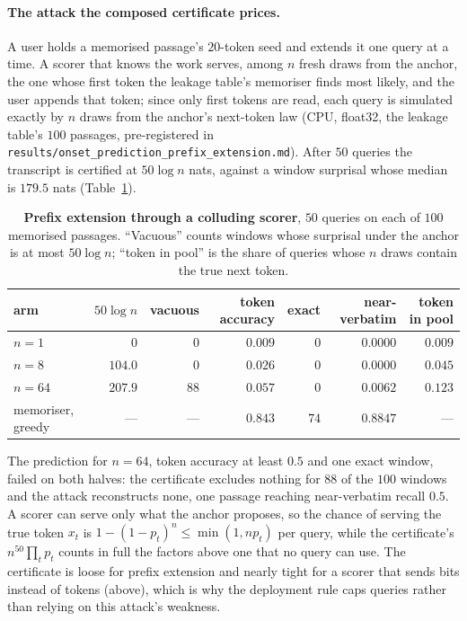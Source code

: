 \paragraph{The attack the composed certificate prices.}\label{app:prefixext}
A user holds a memorised passage's $20$-token seed and extends it one query at a time. A scorer that
knows the work serves, among $n$ fresh draws from the anchor, the one whose first token the leakage
table's memoriser finds most likely, and the user appends that token; since only first tokens are read,
each query is simulated exactly by $n$ draws from the anchor's next-token law (CPU, float32, the
leakage table's $100$ passages, pre-registered in
\texttt{results/\allowbreak onset\_\allowbreak prediction\_\allowbreak prefix\_\allowbreak extension.md}).
After $50$ queries the transcript is certified at $50\log n$ nats, against a window surprisal whose
median is $179.5$ nats (Table~\ref{tab:prefixext}).

\begin{table}[ht]
\centering\footnotesize
\caption{\textbf{Prefix extension through a colluding scorer}, $50$ queries on each of $100$ memorised
passages. ``Vacuous'' counts windows whose surprisal under the anchor is at most $50\log n$; ``token in
pool'' is the share of queries whose $n$ draws contain the true next token.}
\label{tab:prefixext}
\begin{tabular}{lrrrrrr}
\toprule
arm & $50\log n$ & vacuous & token accuracy & exact & near-verbatim & token in pool \\
\midrule
$n=1$ & $0$ & $0$ & $0.009$ & $0$ & $0.0000$ & $0.009$ \\
$n=8$ & $104.0$ & $0$ & $0.026$ & $0$ & $0.0000$ & $0.045$ \\
$n=64$ & $207.9$ & $88$ & $0.057$ & $0$ & $0.0062$ & $0.123$ \\
memoriser, greedy & --- & --- & $0.843$ & $74$ & $0.8847$ & --- \\
\bottomrule
\end{tabular}
\end{table}

The prediction for $n=64$, token accuracy at least $0.5$ and one exact window, failed on both
halves: the certificate excludes nothing for $88$ of the $100$ windows and the attack reconstructs none,
one passage reaching near-verbatim recall $0.5$. A scorer can serve only what the anchor proposes, so
the chance of serving the true token $x_t$ is $1-(1-p_t)^n \le \min(1, n p_t)$ per query, while the
certificate's $n^{50}\prod_t p_t$ counts in full the factors above one that no query can use. The
certificate is loose for prefix extension and nearly tight for a scorer that sends bits instead of
tokens (above), which is why the deployment rule caps queries rather than relying on this attack's
weakness.

